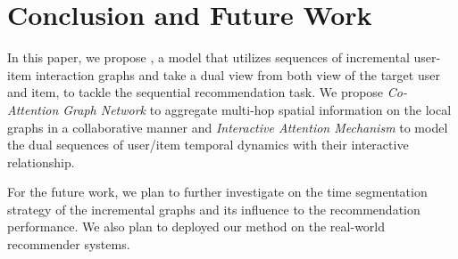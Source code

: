 \chapter{Conclusion and Future Work}\label{sec:con}
In this paper, we propose \score, a model that utilizes sequences of incremental user-item interaction graphs and take a dual view from both view of the target user and item, to tackle the sequential recommendation task. We propose \textit{Co-Attention Graph Network} to aggregate multi-hop spatial information on the local graphs in a collaborative manner and \textit{Interactive Attention Mechanism} to model the dual sequences of user/item temporal dynamics with their interactive relationship.

For the future work, we plan to further investigate on the time segmentation strategy of the incremental graphs and its influence to the recommendation performance. We also plan to deployed our method on the real-world recommender systems.